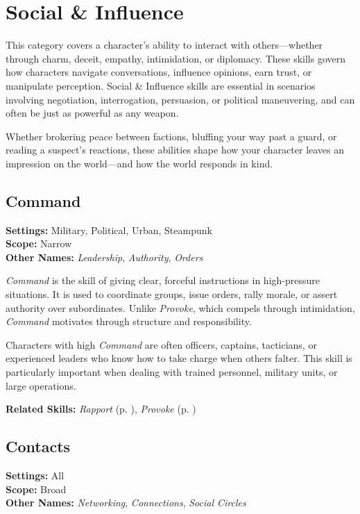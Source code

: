 \section{Social \& Influence}

This category covers a character’s ability to interact with others—whether through charm, deceit, empathy, intimidation, or diplomacy. These skills govern how characters navigate conversations, influence opinions, earn trust, or manipulate perception. Social \& Influence skills are essential in scenarios involving negotiation, interrogation, persuasion, or political maneuvering, and can often be just as powerful as any weapon.

Whether brokering peace between factions, bluffing your way past a guard, or reading a suspect’s reactions, these abilities shape how your character leaves an impression on the world—and how the world responds in kind.

\subsection{Command}\label{skill:command}
\textbf{Settings:} Military, Political, Urban, Steampunk\\
\textbf{Scope:} Narrow\\
\textbf{Other Names:} \emph{Leadership}, \emph{Authority}, \emph{Orders}\\
\vspace{\baselineskip}

\emph{Command} is the skill of giving clear, forceful instructions in high-pressure situations. It is used to coordinate groups, issue orders, rally morale, or assert authority over subordinates. Unlike \emph{Provoke}, which compels through intimidation, \emph{Command} motivates through structure and responsibility.

Characters with high \emph{Command} are often officers, captains, tacticians, or experienced leaders who know how to take charge when others falter. This skill is particularly important when dealing with trained personnel, military units, or large operations.

\vspace{0.5\baselineskip}
\noindent\textbf{Related Skills:} \emph{Rapport} (p. \pageref{skill:rapport}), \emph{Provoke} (p. \pageref{skill:provoke})


\subsection{Contacts}\label{skill:contacts}
\textbf{Settings:} All\\
\textbf{Scope:} Broad\\
\textbf{Other Names:} \emph{Networking}, \emph{Connections}, \emph{Social Circles}\\
\vspace{\baselineskip}

